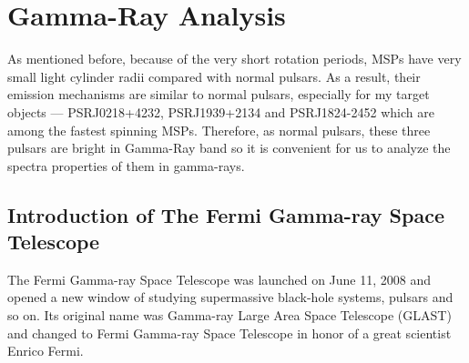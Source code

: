 \documentclass[12pt]{report}
\newcommand{\mycaption}[1]{\caption{\textit{\footnotesize #1}}}
\begin{document}



  \chapter{Gamma-Ray Analysis}
      As mentioned before, because of the very short rotation periods, MSPs have very small light cylinder radii 
      compared with normal pulsars. As a result, their emission mechanisms are similar to normal pulsars, 
      especially for my target objects --- PSRJ0218+4232, PSRJ1939+2134 and PSRJ1824-2452
      which are among the fastest spinning MSPs. Therefore, as normal pulsars, these three 
      pulsars are bright in Gamma-Ray band so it is convenient for us to analyze the spectra 
      properties of them in gamma-rays.
  
      \section{Introduction of The Fermi Gamma-ray Space Telescope}
        The Fermi Gamma-ray Space Telescope was launched on June 11, 2008 and opened a new window of studying
        supermassive black-hole systems, pulsars and so on. Its original name was Gamma-ray Large Area Space 
        Telescope (GLAST) and changed to Fermi Gamma-ray Space Telescope in honor of a great scientist 
        Enrico Fermi. 
\end{document}
